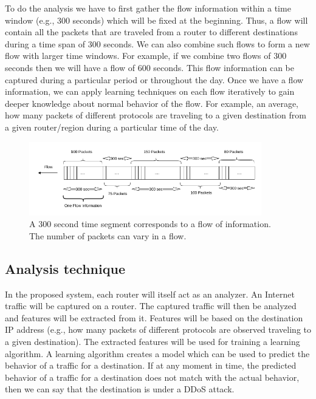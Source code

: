 \documentclass[12pt,oneside,a4paper]{article}
\begin{document}
To do the analysis we have to first gather the flow information within a time window (e.g., 300 seconds) which will be fixed at the beginning. Thus, a flow will contain all the packets that are traveled from a router to different destinations during a time span of 300 seconds. We can also combine such flows to form a new flow with larger time windows. For example, if we combine two flows of 300 seconds then we will have a flow of 600 seconds. This flow information can be captured during a particular period or throughout the day. Once we have a flow information, we can apply learning techniques on each flow iteratively to gain deeper knowledge about normal behavior of the flow. For example, an average, how many packets of different protocols are traveling to a given destination from a given router/region during a particular time of the day.

\begin{figure}[H]
\centering
\includegraphics[width=0.90\textwidth]{Data_Flow_Capture.png}
\caption{A 300 second time segment corresponds to a flow of information. The number of packets can vary in a flow.} \label{fig:flow}
\end{figure}

\subsection{Analysis technique}
In the proposed system, each router will itself act as an analyzer. An Internet traffic will be captured on a router. The captured traffic will then be analyzed and features will be extracted from it. Features will be based on the destination IP address (e.g., how many packets of different protocols are observed traveling to a given destination). The extracted features will be used for training a learning algorithm. A learning algorithm creates a model which can be used to predict the behavior of a traffic for a destination. If at any moment in time, the predicted behavior of a traffic for a destination does not match with the actual behavior, then we can say that the destination is under a DDoS attack.
\end{document}
